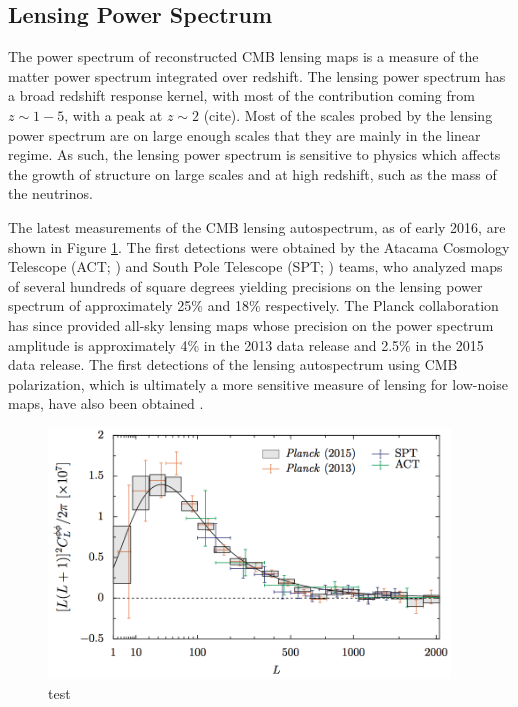 \subsection{Lensing Power Spectrum}\label{kappaPower}

The power spectrum of reconstructed CMB lensing maps is a measure of the matter power spectrum integrated over redshift.  The lensing power spectrum has a broad redshift response kernel, with most of the contribution coming from $z\sim 1-5$, with a peak at $z\sim 2$ (cite).  
Most of the scales probed by the lensing power spectrum are on large enough scales that they are mainly in the linear regime.  As such, the lensing power spectrum is sensitive to physics which affects the growth of structure on large scales and at high redshift, such as the mass of the neutrinos. 

The latest measurements of the CMB lensing autospectrum, as of early 2016, are shown in Figure \ref{CMBLensPower}. The first detections were obtained by the Atacama Cosmology Telescope (ACT; \cite{das/etal/2011}) and South Pole Telescope  (SPT; \cite{vanengelen/etal/2012}) teams, who analyzed maps of several hundreds of square degrees yielding precisions on the lensing power spectrum of approximately 25\% and 18\% respectively.  The Planck collaboration has since provided all-sky lensing maps whose precision on the power spectrum amplitude is approximately 4\% in the 2013 data release and 2.5\% in the 2015 data release.  The first detections of the lensing autospectrum using CMB polarization, which is ultimately a more sensitive measure of lensing for low-noise maps,  have also been obtained \cite{story/etal/2013, polarbear/lensing//2014}.

\begin{figure}[h]
\includegraphics[width=0.95\textwidth]{CMBLensing/CMBLensPower.png}
\caption{test}
\label{CMBLensPower}
\end{figure}

